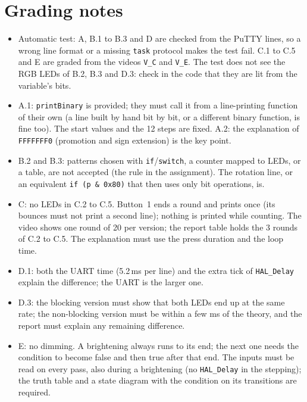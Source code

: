 \documentclass[11pt,a4paper]{article}
\begin{document}
\section{Grading notes}
\begin{itemize}
  \item Automatic test: A, B.1 to B.3 and D are checked from the PuTTY lines, so a wrong line format or a missing
        \texttt{task} protocol makes the test fail. C.1 to C.5 and E are graded from the videos \texttt{V\_C} and
        \texttt{V\_E}. The test does not see the RGB LEDs of B.2, B.3 and D.3: check in the code that they are lit
        from the variable's bits.
  \item A.1: \texttt{printBinary} is provided; they must call it from a line-printing function of their own (a
        line built by hand bit by bit, or a different binary function, is fine too). The start values and the 12 steps are fixed. A.2: the explanation of \texttt{FFFFFFF0} (promotion and sign extension) is the key point.
  \item B.2 and B.3: patterns chosen with \texttt{if}/\texttt{switch}, a counter mapped to LEDs, or a table, are not
        accepted (the rule in the assignment). The rotation line, or an equivalent \texttt{if (p \& 0x80)} that then uses
        only bit operations, is.
  \item C: no LEDs in C.2 to C.5. Button~1 ends a round and prints once (its bounces must not print a second line);
        nothing is printed while counting. The video shows one round of 20 per version; the report table holds the
        3 rounds of C.2 to C.5. The explanation must use the press duration and the loop time.
  \item D.1: both the UART time (5.2\,ms per line) and the extra tick of \texttt{HAL\_Delay} explain the difference; the
        UART is the larger one.
  \item D.3: the blocking version must show that both LEDs end up at the same rate; the non-blocking version must be
        within a few ms of the theory, and the report must explain any remaining difference.
  \item E: no dimming. A brightening always runs to its end; the next one needs the condition to become false and
        then true after that end. The inputs must be read on every pass, also during a brightening (no
        \texttt{HAL\_Delay} in the stepping); the truth table and a state diagram with the condition on its
        transitions are required.
\end{itemize}
\end{document}
